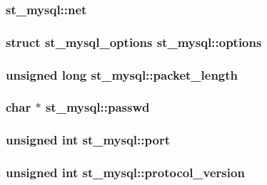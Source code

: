 \subsubsection[{net}]{ st\+\_\+mysql\+::net}\label{structst__mysql_a4ad66660f7b58712cb4bcaa852d4048c}
\hypertarget{structst__mysql_af5b1e7032c012c17dbb967fa4ac212a9}{}
\subsubsection[{options}]{\setlength{\rightskip}{0pt plus 5cm}struct {\bf st\+\_\+mysql\+\_\+options} st\+\_\+mysql\+::options}\label{structst__mysql_af5b1e7032c012c17dbb967fa4ac212a9}
\hypertarget{structst__mysql_afa6ee000a88fe95750c9f1acd9711023}{}
\subsubsection[{packet\+\_\+length}]{\setlength{\rightskip}{0pt plus 5cm}unsigned long st\+\_\+mysql\+::packet\+\_\+length}\label{structst__mysql_afa6ee000a88fe95750c9f1acd9711023}
\hypertarget{structst__mysql_a63e75633e001c08953663a632819b285}{}
\subsubsection[{passwd}]{\setlength{\rightskip}{0pt plus 5cm}char $\ast$ st\+\_\+mysql\+::passwd}\label{structst__mysql_a63e75633e001c08953663a632819b285}
\hypertarget{structst__mysql_a285c6023c0903a47d4e6cdebde4c6dfe}{}
\subsubsection[{port}]{\setlength{\rightskip}{0pt plus 5cm}unsigned int st\+\_\+mysql\+::port}\label{structst__mysql_a285c6023c0903a47d4e6cdebde4c6dfe}
\hypertarget{structst__mysql_a43e5c1629a6db251dc9b5d4eecceb209}{}
\subsubsection[{protocol\+\_\+version}]{\setlength{\rightskip}{0pt plus 5cm}unsigned int st\+\_\+mysql\+::protocol\+\_\+version}\label{structst__mysql_a43e5c1629a6db251dc9b5d4eecceb209}
\hypertarget{structst__mysql_a802266361a427c12d6cb29a27f8889b1}{}
